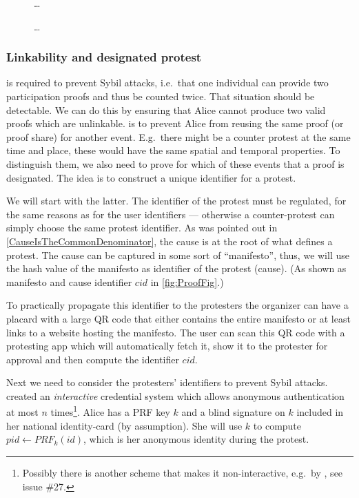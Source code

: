 \begin{figure}
  \centering
  \dots
  \caption{%
    \dots
  }%
  \label{fig:ProtocolOverview}
\end{figure}

\subsubsection{Linkability and designated protest}

 is required to prevent Sybil attacks, i.e.\ that one individual 
can provide two participation proofs and thus be counted twice.
That situation should be detectable.
We can do this by ensuring that Alice cannot produce two valid proofs which
are unlinkable.
 is to prevent Alice from reusing the same proof (or proof 
share) for another event.
E.g.\ there might be a counter protest at the same time and place, these would 
have the same spatial and temporal properties.
To distinguish them, we also need to prove for which of these events that a 
proof is designated.
The idea is to construct a unique identifier for a protest.

We will start with the latter.
The identifier of the protest must be regulated, for the same reasons as for the 
user identifiers --- otherwise a counter-protest can simply choose the same 
protest identifier.
As was pointed out in \cref{CauseIsTheCommonDenominator}, the cause is at the 
root of what defines a protest.
The cause can be captured in some sort of \enquote{manifesto}, thus, we will use 
the hash value of the manifesto as identifier of the protest (cause).
(As shown as manifesto and cause identifier \(cid\) in \cref{fig:ProofFig}.)

To practically propagate this identifier to the protesters the organizer can 
have a placard with a large QR code that either contains the entire manifesto or 
at least links to a website hosting the manifesto.
The user can scan this QR code with a protesting app which will automatically 
fetch it, show it to the protester for approval and then compute the identifier 
\(cid\).

Next we need to consider the protesters' identifiers to prevent Sybil attacks.
\Textcite{HowToWinTheCloneWars} created an \emph{interactive} credential system 
which allows anonymous authentication at most \(n\) times\footnote{%
  Possibly there is another scheme that makes it non-interactive, e.g.\ by 
  \Textcite{Psignatures}, see issue \#27.
}.
Alice has a \ac{PRF} key \(k\) and a blind signature on \(k\) included in her 
national identity-card (by assumption).
She will use \(k\) to compute \(pid\gets PRF_k(id)\), which is her anonymous 
identity during the protest.

